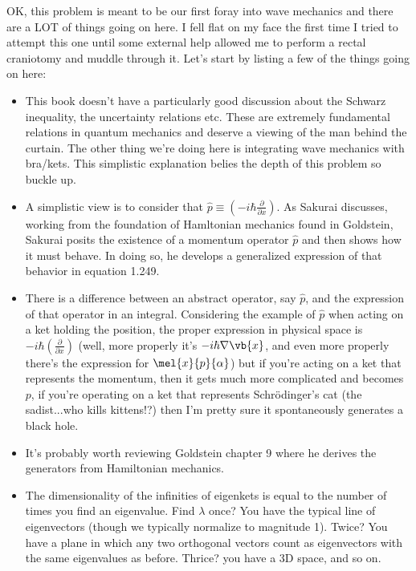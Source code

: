 \begin{purpose}
  OK, this problem is meant to be our first foray into wave mechanics
  and there are a LOT of things going on here.  I fell flat on my face
  the first time I tried to attempt this one until some external help
  allowed me to perform a rectal craniotomy and muddle through it.
  Let's start by listing a few of the things going on here:

  \begin{itemize}

    \item This book doesn't have a particularly good discussion about
      the Schwarz inequality, the uncertainty relations etc.  These
      are extremely fundamental relations in quantum mechanics and
      deserve a viewing of the man behind the curtain.  The other
      thing we're doing here is integrating wave mechanics with
      bra/kets.  This simplistic explanation belies the depth of this
      problem so buckle up.

  \item A simplistic view is to consider that $\hat{p} \equiv \left(
    -i \hbar \frac{\partial}{\partial x}\right)$.  As Sakurai
    discusses, working from the foundation of Hamltonian mechanics
    found in Goldstein, Sakurai posits the existence of a momentum
    operator $\hat{p}$ and then shows how it must behave.  In doing
    so, he develops a generalized expression of that behavior in
    equation 1.249.

  \item There is a difference between an abstract operator, say
    $\hat{p}$, and the expression of that operator in an integral.
    Considering the example of $\hat{p}$ when acting on a ket holding
    the position, the proper expression in physical space is $-i \hbar
    \left(\frac{\partial}{\partial x}\right)$ (well, more properly
    it's $-i \hbar \nabla \vb{x}$, and even more properly
    there's the expression for $\mel{x}{p}{\alpha}$) but if you're
    acting on a ket that represents the momentum, then it gets much
    more complicated and becomes $p$, if you're operating on a ket
    that represents Schr\"{o}dinger's cat (the sadist...who kills
    kittens!?) then I'm pretty sure it spontaneously generates a black
    hole.

  \item It's probably worth reviewing Goldstein chapter 9 where he
    derives the generators from Hamiltonian mechanics.

  \item The dimensionality of the infinities of eigenkets is equal to
    the number of times you find an eigenvalue.  Find $\lambda$ once?
    You have the typical line of eigenvectors (though we typically
    normalize to magnitude 1).  Twice?  You have a plane in which any
    two orthogonal vectors count as eigenvectors with the same
    eigenvalues as before.  Thrice?  you have a 3D space, and so on.

  \end{itemize}
\end{purpose}

